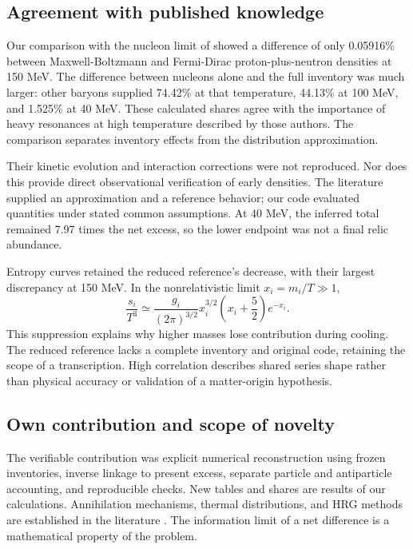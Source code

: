 \subsection{Agreement with published knowledge}
Our comparison with the nucleon limit of \citet{Satarov2013} showed a difference of only 0.05916\% between Maxwell-Boltzmann and Fermi-Dirac proton-plus-neutron densities at 150 MeV. The difference between nucleons alone and the full inventory was much larger: other baryons supplied 74.42\% at that temperature, 44.13\% at 100 MeV, and 1.525\% at 40 MeV. These calculated shares agree with the importance of heavy resonances at high temperature described by those authors. The comparison separates inventory effects from the distribution approximation.

Their kinetic evolution and interaction corrections were not reproduced. Nor does this provide direct observational verification of early densities. The literature supplied an approximation and a reference behavior; our code evaluated quantities under stated common assumptions. At 40 MeV, the inferred total remained 7.97 times the net excess, so the lower endpoint was not a final relic abundance.

Entropy curves retained the reduced reference's decrease, with their largest discrepancy at 150 MeV. In the nonrelativistic limit $x_i=m_i/T\gg1$,
\begin{equation}
\frac{s_i}{T^3}\simeq
\frac{g_i}{(2\pi)^{3/2}}x_i^{3/2}
\left(x_i+\frac{5}{2}\right)e^{-x_i}.
\label{eq:asymptotic}
\end{equation}
This suppression explains why higher masses lose contribution during cooling. The reduced reference lacks a complete inventory and original code, retaining the scope of a transcription. High correlation describes shared series shape rather than physical accuracy or validation of a matter-origin hypothesis.

\subsection{Own contribution and scope of novelty}
The verifiable contribution was explicit numerical reconstruction using frozen inventories, inverse linkage to present excess, separate particle and antiparticle accounting, and reproducible checks. New tables and shares are results of our calculations. Annihilation mechanisms, thermal distributions, and HRG methods are established in the literature \citep{Vovchenko2019,Satarov2013}. The information limit of a net difference is a mathematical property of the problem.

